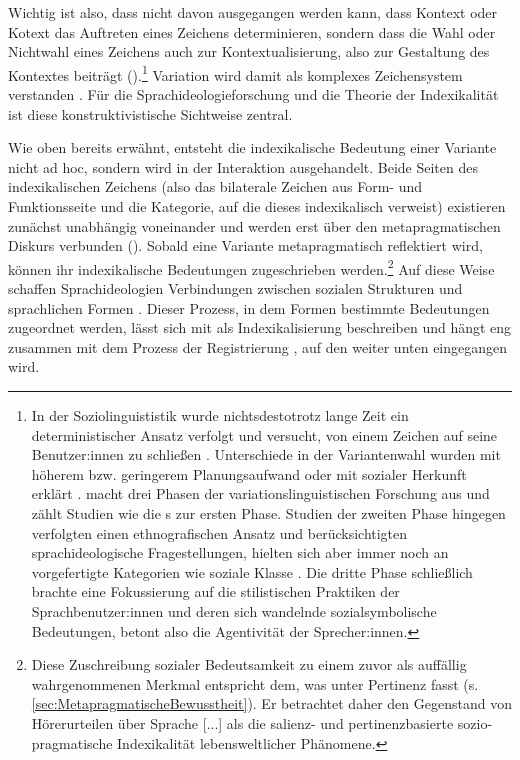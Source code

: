 Wichtig ist also, dass nicht davon ausgegangen werden kann, dass Kontext oder Kotext das Auftreten eines Zeichens determinieren, sondern dass die Wahl oder Nichtwahl eines Zeichens auch zur Kontextualisierung, also zur Gestaltung des Kontextes beiträgt (\cites[s.][23]{Auer.1986}[42--43]{Gumperz.1992b}).\footnote{In der Soziolinguististik wurde nichtsdestotrotz lange Zeit ein deterministischer Ansatz verfolgt und versucht, von einem Zeichen auf seine Benutzer:innen zu schließen \citep[s.][88--90]{Eckert2012}.
Unterschiede in der Variantenwahl wurden mit höherem bzw. geringerem Planungsaufwand oder mit sozialer Herkunft erklärt \citep[vgl. etwa die Kaufhausstudie von][]{Labov2006}.
\citet{Eckert2012} macht drei Phasen der variationslinguistischen Forschung aus und zählt Studien wie die \citeauthor{Labov2006}s zur ersten Phase.
Studien der zweiten Phase hingegen verfolgten einen ethnografischen Ansatz und berücksichtigten sprachideologische Fragestellungen, hielten sich aber immer noch an vorgefertigte Kategorien wie soziale Klasse \citep[s.][93]{Eckert2012}. Die dritte Phase schließlich brachte eine Fokussierung auf die stilistischen Praktiken der Sprachbenutzer:innen und deren sich wandelnde sozialsymbolische Bedeutungen, betont also die Agentivität der Sprecher:innen.} 
Variation wird damit als komplexes Zeichensystem verstanden \citep[s.][92]{Eckert2012}.
Für die Sprachideologieforschung und die Theorie der Indexikalität ist diese konstruktivistische Sichtweise zentral.

Wie oben bereits erwähnt, entsteht die indexikalische Bedeutung einer Variante nicht ad hoc, sondern wird in der Interaktion ausgehandelt. 
Beide Seiten des {in\-dexi\-ka\-li\-schen} Zeichens (also das bilaterale Zeichen aus Form- und Funktionsseite und die Kategorie, auf die dieses indexikalisch verweist) existieren zunächst unabh{\"a}ngig voneinander und werden erst über den metapragmatischen Diskurs verbunden (\cites[s.][316]{Silverstein1992}[86]{Jaffe.2016}). 
Sobald eine Variante metapragmatisch reflektiert wird, können ihr indexikalische Bedeutungen zugeschrieben werden.\footnote{Diese Zuschreibung sozialer Bedeutsamkeit zu einem zuvor als auffällig wahrgenommenen Merkmal entspricht dem, was \citeauthor{Purschke2014} unter Pertinenz fasst (s. \autoref{sec:MetapragmatischeBewusstheit}). Er betrachtet daher den {\glqq}Gegenstand von Hörerurteilen über Sprache [...] als die salienz- und pertinenzbasierte sozio-pragmatische Indexikalität lebensweltlicher Phänomene{\grqq}\citep[44]{Purschke2014}.} 
Auf diese Weise schaffen Sprachideologien Verbindungen zwischen sozialen Strukturen und sprachlichen Formen \citep[s.][55]{Woolard1994}. 
Dieser Prozess, in dem Formen bestimmte Bedeutungen zugeordnet werden, lässt sich mit \citet[86]{Jaffe.2016} als Indexikalisierung beschreiben und hängt eng zusammen mit dem Prozess der Registrierung \citep[s.][]{Agha2007}, auf den weiter unten eingegangen wird.

